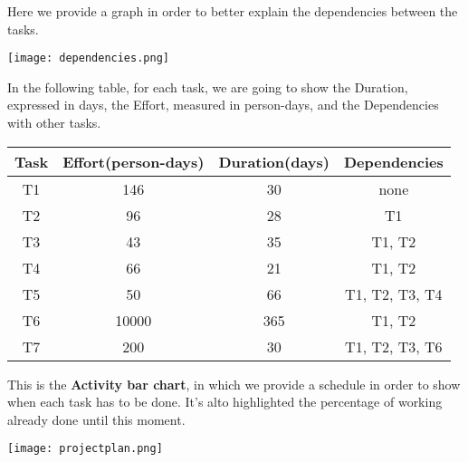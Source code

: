 \pagebreak
Here we provide a graph in order to better explain the dependencies between the tasks.
\begin{center}
	\texttt{[image: dependencies.png]}
\end{center}

In the following table, for each task, we are going to show the Duration, expressed in days, the Effort, measured in person-days, and the Dependencies with other tasks.
\begin{center}
	\begin{tabular}{c c c c}
		\hline
		\textbf{Task} & \textbf{Effort(person-days)} & \textbf{Duration(days)} & \textbf{Dependencies} \\
		\hline
		T1 & 146 & 30 & none \\
		T2 & 96 & 28 & T1 \\
		T3 & 43 & 35 & T1, T2 \\
		T4 & 66 & 21 & T1, T2 \\
		T5 & 50 & 66 & T1, T2, T3, T4 \\
		T6 & 10000 & 365 & T1, T2 \\
		T7 & 200 & 30 & T1, T2, T3, T6  \\
		\hline
	\end{tabular}
\end{center}

This is the \textbf{Activity bar chart}, in which we provide a schedule in order to show when each task has to be done. It's alto highlighted the percentage of working already done until this moment.  
\begin{center}
	\texttt{[image: projectplan.png]}
\end{center}

